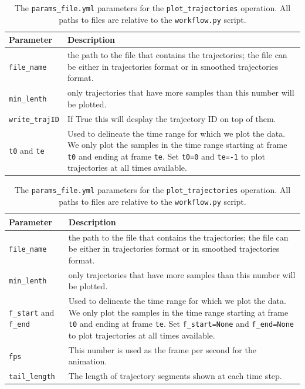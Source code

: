 \documentclass[10pt,a4paper]{article}
\begin{document}
%
\begin{table}[!ht]
	\centering
	\caption{The \texttt{params\_file.yml} parameters for the \texttt{plot\_trajectories} operation. All paths to files are relative to the \texttt{workflow.py} script. \label{tab:plotting_parameter}}
	\begin{tabular}{l m{12cm}}
		\hline
		Parameter & Description\\[.2cm]
		\hline
		\texttt{file\_name} & the path to the file that contains the trajectories; the file can be either in trajectories format or in smoothed trajectories format. \\[.2cm]
		\texttt{min\_lenth} & only trajectories that have more samples than this number will be plotted.\\[.2cm]
		\texttt{write\_trajID} & If True this will desplay the trajectory ID on top of them.\\[.2cm]
		\texttt{t0} and \texttt{te} & Used to delineate the time range for which we plot the data. We only plot the samples in the time range starting at frame \texttt{t0} and ending at frame \texttt{te}. Set \texttt{t0=0} and \texttt{te=-1} to plot trajectories at all times available. \\[.2cm]
		\hline
	\end{tabular}
\end{table}




\begin{table}[!ht]
	\centering
	\caption{The \texttt{params\_file.yml} parameters for the \texttt{plot\_trajectories} operation. All paths to files are relative to the \texttt{workflow.py} script. \label{tab:animation_parameter}}
	\begin{tabular}{l m{12cm}}
		\hline
		Parameter & Description\\[.2cm]
		\hline
		\texttt{file\_name} & the path to the file that contains the trajectories; the file can be either in trajectories format or in smoothed trajectories format. \\[.2cm]
		\texttt{min\_lenth} & only trajectories that have more samples than this number will be plotted.\\[.2cm]
		\texttt{f\_start} and \texttt{f\_end} & Used to delineate the time range for which we plot the data. We only plot the samples in the time range starting at frame \texttt{t0} and ending at frame \texttt{te}. Set \texttt{f\_start=None} and \texttt{f\_end=None} to plot trajectories at all times available. \\[.2cm]
		\texttt{fps} & This number is used as the frame per second for the animation.\\[.2cm]
		\texttt{tail\_length} & The length of trajectory segments shown at each time step.\\[.2cm] 
		\hline
	\end{tabular}
\end{table}
\end{document}
